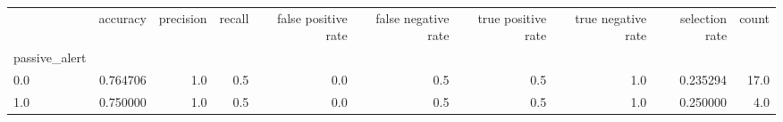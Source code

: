 \begin{tabular}{lrrrrrrrrr}
\toprule
{} &  accuracy &  precision &  recall &  false positive rate &  false negative rate &  true positive rate &  true negative rate &  selection rate &  count \\
passive\_alert &           &            &         &                      &                      &                     &                     &                 &        \\
\midrule
0.0           &  0.764706 &        1.0 &     0.5 &                  0.0 &                  0.5 &                 0.5 &                 1.0 &        0.235294 &   17.0 \\
1.0           &  0.750000 &        1.0 &     0.5 &                  0.0 &                  0.5 &                 0.5 &                 1.0 &        0.250000 &    4.0 \\
\bottomrule
\end{tabular}
